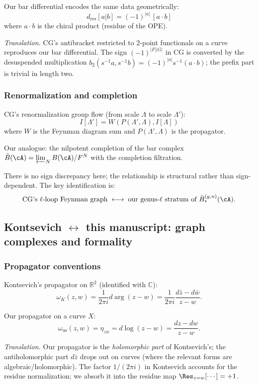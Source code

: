 Our bar differential encodes the same data geometrically:
\[
d_{\mathrm{res}}[a|b] = (-1)^{|a|}\, [a \cdot b]
\]
where $a \cdot b$ is the chiral product (residue of the OPE).

\emph{Translation.} CG's antibracket restricted to 2-point functionals on a
curve reproduces our bar differential. The sign $(-1)^{|F||G|}$ in CG
is converted by the desuspended multiplication
$b_2(s^{-1}a,s^{-1}b)=(-1)^{|a|}s^{-1}(a\cdot b)$; the prefix part is
trivial in length two.

\subsubsection{Renormalization and completion}

CG's renormalization group flow (from scale $\Lambda$ to scale $\Lambda'$):
\[
I[\Lambda'] = W(P(\Lambda', \Lambda), I[\Lambda])
\]
where $W$ is the Feynman diagram sum and $P(\Lambda',\Lambda)$ is the propagator.

Our analogue: the nilpotent completion of the bar complex
$\hat{B}(\cA) = \varprojlim_N B(\cA)/F^N$ with the completion filtration.

There is no sign discrepancy here; the relationship is structural rather
than sign-dependent. The key identification is:
\[
\text{CG's $\ell$-loop Feynman graph} \;\longleftrightarrow\;
\text{our genus-$\ell$ stratum of }\bar{B}^{(g,n)}_*(\cA).
\]

\subsection{Kontsevich $\leftrightarrow$ this manuscript: graph complexes and formality}
\label{sec:kont-us-formulas}

\subsubsection{Propagator conventions}

Kontsevich's propagator on $\mathbb{R}^2$ (identified with $\mathbb{C}$):
\[
\omega_K(z, w) = \frac{1}{2\pi i} d\arg(z - w)
 = \frac{1}{2\pi i} \frac{d\bar{z} - d\bar{w}}{z - w}.
\]

Our propagator on a curve $X$:
\[
\omega_{\mathrm{us}}(z, w) = \eta_{zw} = d\log(z - w) = \frac{dz - dw}{z - w}.
\]

\emph{Translation.} Our propagator is the \emph{holomorphic part} of
Kontsevich's; the antiholomorphic part $d\bar{z}$ drops out on curves
(where the relevant forms are algebraic/holomorphic). The factor
$1/(2\pi i)$ in Kontsevich accounts for the residue normalization;
we absorb it into the residue map $\Res_{z=w}[\cdots] = +1$.

